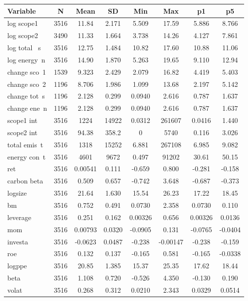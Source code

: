 \documentclass[]{article}
\begin{document}
\begin{tabular}{lccccccc} \hline
Variable & N & Mean & SD & Min & Max & p1 & p5 \\ \hline
log scope1 & 3516 & 11.84 & 2.171 & 5.509 & 17.59 & 5.886 & 8.766 \\
log scope2 & 3490 & 11.33 & 1.664 & 3.738 & 14.26 & 4.127 & 7.861 \\
log total ~s & 3516 & 12.75 & 1.484 & 10.82 & 17.60 & 10.88 & 11.06 \\
log energy~n & 3516 & 14.90 & 1.870 & 5.263 & 19.65 & 9.110 & 12.94 \\
change sco~1 & 1539 & 9.323 & 2.429 & 2.079 & 16.82 & 4.419 & 5.403 \\
change sco~2 & 1196 & 8.706 & 1.986 & 1.099 & 13.68 & 2.197 & 5.142 \\
change tot~s & 1196 & 2.128 & 0.299 & 0.0940 & 2.616 & 0.787 & 1.637 \\
change ene~n & 1196 & 2.128 & 0.299 & 0.0940 & 2.616 & 0.787 & 1.637 \\
scope1 int & 3516 & 1224 & 14922 & 0.0312 & 261607 & 0.0416 & 1.440 \\
scope2 int & 3516 & 94.38 & 358.2 & 0 & 5740 & 0.116 & 3.026 \\
total emis~t & 3516 & 1318 & 15252 & 6.881 & 267108 & 6.985 & 9.082 \\
energy con~t & 3516 & 4601 & 9672 & 0.497 & 91202 & 30.61 & 50.15 \\
ret & 3516 & 0.00541 & 0.111 & -0.659 & 0.800 & -0.281 & -0.158 \\
carbon beta & 3516 & 0.509 & 0.657 & -0.742 & 3.648 & -0.687 & -0.373 \\
logsize & 3516 & 21.64 & 1.630 & 15.54 & 26.23 & 17.22 & 18.45 \\
bm & 3516 & 0.752 & 0.491 & 0.0730 & 2.358 & 0.0730 & 0.110 \\
leverage & 3516 & 0.251 & 0.162 & 0.00326 & 0.656 & 0.00326 & 0.0136 \\
mom & 3516 & 0.00793 & 0.0320 & -0.0905 & 0.131 & -0.0765 & -0.0404 \\
investa & 3516 & -0.0623 & 0.0487 & -0.238 & -0.00147 & -0.238 & -0.159 \\
roe & 3516 & 0.132 & 0.137 & -0.165 & 0.581 & -0.165 & -0.0338 \\
logppe & 3516 & 20.85 & 1.385 & 15.37 & 25.35 & 17.62 & 18.44 \\
beta & 3516 & 1.108 & 0.720 & -0.526 & 4.350 & -0.130 & 0.190 \\
volat & 3516 & 0.268 & 0.312 & 0.0210 & 2.343 & 0.0329 & 0.0514 \\

\end{tabular}
\end{document}
